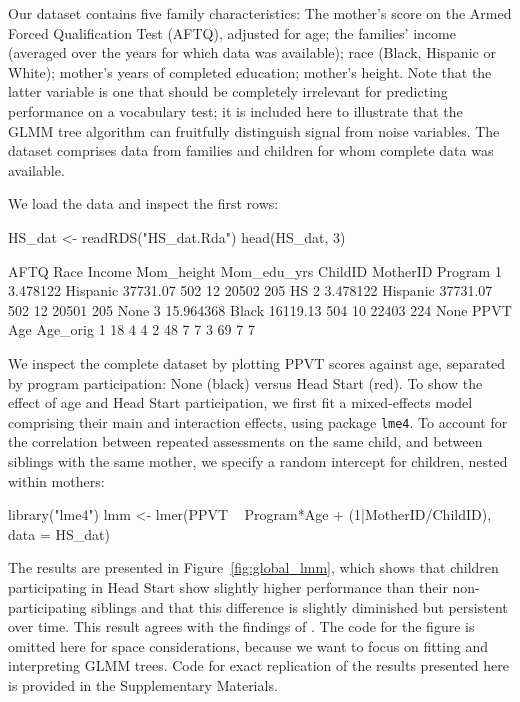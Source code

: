 \documentclass[doc,floatsintext,natbib]{apa7}
\begin{document}
Our dataset contains five family characteristics: The mother's score on the Armed Forced Qualification Test (AFTQ), adjusted for age; the families' income (averaged over the years for which data was available); race (Black, Hispanic or White); mother's years of completed education; mother's height. Note that the latter variable is one that should be completely irrelevant for predicting performance on a vocabulary test; it is included here to illustrate that the GLMM tree algorithm can fruitfully distinguish signal from noise variables. The dataset comprises data from families and children for whom complete data was available. 

We load the data and inspect the first rows:

\begin{Schunk}
\begin{Sinput}
 HS_dat <- readRDS("HS_dat.Rda")
 head(HS_dat, 3)
\end{Sinput}
\begin{Soutput}
       AFTQ     Race   Income Mom_height Mom_edu_yrs ChildID MotherID Program
1  3.478122 Hispanic 37731.07        502          12   20502      205      HS
2  3.478122 Hispanic 37731.07        502          12   20501      205    None
3 15.964368    Black 16119.13        504          10   22403      224    None
  PPVT Age Age_orig
1   18   4        4
2   48   7        7
3   69   7        7
\end{Soutput}
\end{Schunk}

We inspect the complete dataset by plotting PPVT scores against age, separated by program participation: None (black) versus Head Start (red). To show the effect of age and Head Start participation, we first fit a mixed-effects model comprising their main and interaction effects, using package \texttt{lme4}. To account for the correlation between repeated assessments on the same child, and between siblings with the same mother, we specify a random intercept for children, nested within mothers:

\begin{Schunk}
\begin{Sinput}
 library("lme4")
 lmm <- lmer(PPVT ~ Program*Age + (1|MotherID/ChildID), data = HS_dat)
\end{Sinput}
\end{Schunk}

The results are presented in Figure~\ref{fig:global_lmm}, which shows that children participating in Head Start show slightly higher performance than their non-participating siblings and that this difference is slightly diminished but persistent over time. This result agrees with the findings of \cite{Demi09}. The code for the figure is omitted here for space considerations, because we want to focus on fitting and interpreting GLMM trees. Code for exact replication of the results presented here is provided in the Supplementary Materials. 
\end{document}
